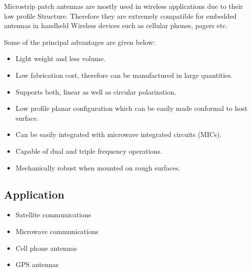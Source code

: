  \justify
     Microstrip patch antennas are mostly used in wireless applications due to their low profile Structure. Therefore they are extremely compatible for embedded antennas in handheld Wireless devices such as cellular phones, pagers etc.
     
     
      Some of the principal advantages are given below:
        \begin{itemize}
          	\item Light weight and less volume.
          	\item Low fabrication cost, therefore can be manufactured in large quantities.
           	\item Supports both, linear as well as circular polarization.
           	\item Low profile planar configuration which can be easily made conformal to host surface.
           	\item Can be easily integrated with microwave integrated circuits (MICs).
           	\item Capable of dual and triple frequency operations.
           	\item Mechanically robust when mounted on rough surfaces.
         \end{itemize}

      \subsection{Application}
         \begin{itemize}
          	\item Satellite communications
           	\item Microwave communications
           	\item Cell phone antennas
           	\item GPS antennas

         \end{itemize}
         
\cleardoublepage